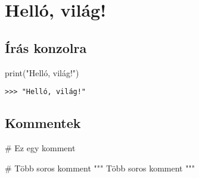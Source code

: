 \section{Helló, világ!}

\subsection{Írás konzolra}

\begin{pycode}
print("Helló, világ!")
\end{pycode}
\begin{verbatim}
>>> "Helló, világ!"
\end{verbatim}

\subsection{Kommentek}
\begin{pycode}
# Ez egy komment

# Több soros komment
"""
Több
soros
komment
"""
\end{pycode}